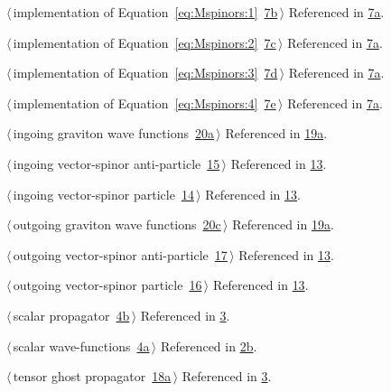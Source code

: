 \documentclass[a4paper,12pt]{amsart}
\renewcommand{\NWlink}[2]{\hyperlink{#1}{#2}}
\renewcommand{\NWtxtRefIn}{Referenced in}
\begin{document}
{\begin{list}{}{\setlength{\itemsep}{-\parsep}\setlength{\itemindent}{-\leftmargin}}
\item $\langle\,$implementation of Equation~\eqref{eq:Mspinors:1}\nobreak\ {\footnotesize \NWlink{nuweb7b}{7b}}$\,\rangle$ {\footnotesize {\NWtxtRefIn} \NWlink{nuweb7a}{7a}.}
\item $\langle\,$implementation of Equation~\eqref{eq:Mspinors:2}\nobreak\ {\footnotesize \NWlink{nuweb7c}{7c}}$\,\rangle$ {\footnotesize {\NWtxtRefIn} \NWlink{nuweb7a}{7a}.}
\item $\langle\,$implementation of Equation~\eqref{eq:Mspinors:3}\nobreak\ {\footnotesize \NWlink{nuweb7d}{7d}}$\,\rangle$ {\footnotesize {\NWtxtRefIn} \NWlink{nuweb7a}{7a}.}
\item $\langle\,$implementation of Equation~\eqref{eq:Mspinors:4}\nobreak\ {\footnotesize \NWlink{nuweb7e}{7e}}$\,\rangle$ {\footnotesize {\NWtxtRefIn} \NWlink{nuweb7a}{7a}.}
\item $\langle\,$ingoing graviton wave functions\nobreak\ {\footnotesize \NWlink{nuweb20a}{20a}}$\,\rangle$ {\footnotesize {\NWtxtRefIn} \NWlink{nuweb19a}{19a}.}
\item $\langle\,$ingoing vector-spinor anti-particle\nobreak\ {\footnotesize \NWlink{nuweb15}{15}}$\,\rangle$ {\footnotesize {\NWtxtRefIn} \NWlink{nuweb13}{13}.}
\item $\langle\,$ingoing vector-spinor particle\nobreak\ {\footnotesize \NWlink{nuweb14}{14}}$\,\rangle$ {\footnotesize {\NWtxtRefIn} \NWlink{nuweb13}{13}.}
\item $\langle\,$outgoing graviton wave functions\nobreak\ {\footnotesize \NWlink{nuweb20c}{20c}}$\,\rangle$ {\footnotesize {\NWtxtRefIn} \NWlink{nuweb19a}{19a}.}
\item $\langle\,$outgoing vector-spinor anti-particle\nobreak\ {\footnotesize \NWlink{nuweb17}{17}}$\,\rangle$ {\footnotesize {\NWtxtRefIn} \NWlink{nuweb13}{13}.}
\item $\langle\,$outgoing vector-spinor particle\nobreak\ {\footnotesize \NWlink{nuweb16}{16}}$\,\rangle$ {\footnotesize {\NWtxtRefIn} \NWlink{nuweb13}{13}.}
\item $\langle\,$scalar propagator\nobreak\ {\footnotesize \NWlink{nuweb4b}{4b}}$\,\rangle$ {\footnotesize {\NWtxtRefIn} \NWlink{nuweb3}{3}.}
\item $\langle\,$scalar wave-functions\nobreak\ {\footnotesize \NWlink{nuweb4a}{4a}}$\,\rangle$ {\footnotesize {\NWtxtRefIn} \NWlink{nuweb2b}{2b}.}
\item $\langle\,$tensor ghost propagator\nobreak\ {\footnotesize \NWlink{nuweb18a}{18a}}$\,\rangle$ {\footnotesize {\NWtxtRefIn} \NWlink{nuweb3}{3}.}

\end{list}}
\end{document}
